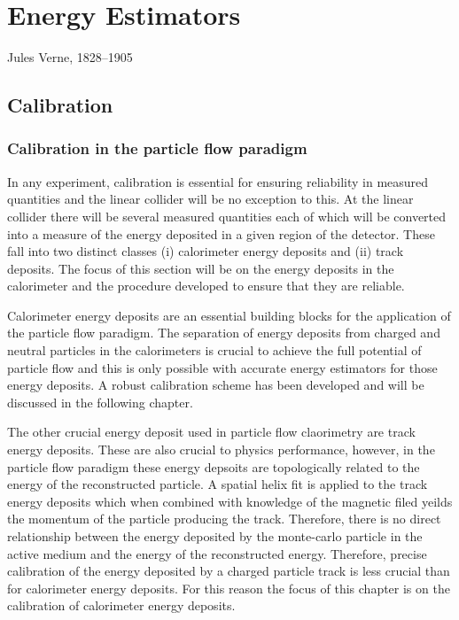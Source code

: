 \chapter{Energy Estimators}
\label{chap:MoreStuff}

{Jules Verne, 1828--1905}

\section{Calibration}

\subsection{Calibration in the particle flow paradigm}


In any experiment, calibration is essential for ensuring reliability in measured quantities and the linear collider will be no exception to this.  At the linear collider there will be several measured quantities each of which will be converted into a measure of the energy deposited in a given region of the detector.  These fall into two distinct classes (i) calorimeter energy deposits and (ii) track deposits.  The focus of this section will be on the energy deposits in the calorimeter and the procedure developed to ensure that they are reliable.  

Calorimeter energy deposits are an essential building blocks for the application of the particle flow paradigm.  The separation of energy deposits from charged and neutral particles in the calorimeters is crucial to achieve the full potential of particle flow and this is only possible with accurate energy estimators for those energy deposits.  A robust calibration scheme has been developed and will be discussed in the following chapter. 

The other crucial energy deposit used in particle flow claorimetry are track energy deposits.  These are also crucial to physics performance, however, in the particle flow paradigm these energy depsoits are topologically related to the energy of the reconstructed particle.  A spatial helix fit is applied to the track energy deposits which when combined with knowledge of the magnetic filed yeilds the momentum of the particle producing the track.  Therefore, there is no direct relationship between the energy deposited by the monte-carlo particle in the active medium and the energy of the reconstructed energy.  Therefore, precise calibration of the energy deposited by a charged particle track is less crucial than for calorimeter energy deposits.  For this reason the focus of this chapter is on the calibration of calorimeter energy deposits. 

